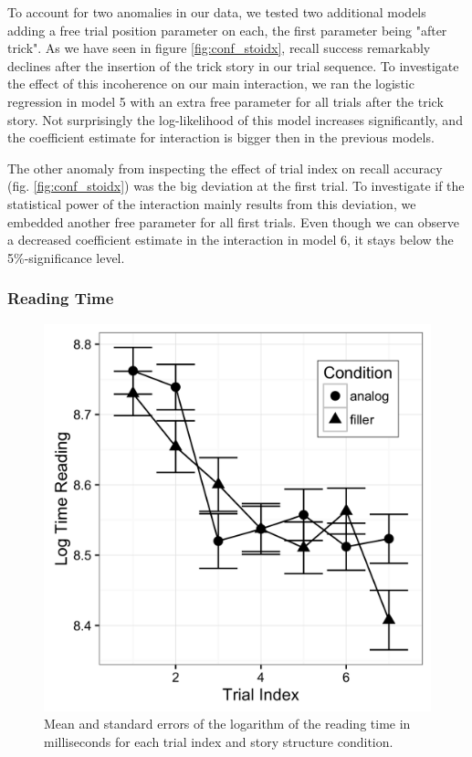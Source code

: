 \documentclass[a4paper,man,natbib,floatsintext,import]{apa6}
\begin{document}
\begin{landscape}

\end{landscape}

To account for two anomalies in our data, we tested two additional models adding a free trial position parameter on each, the first parameter being "after trick". As we have seen in figure \ref{fig:conf_stoidx}, recall success remarkably declines after the insertion of the trick story in our trial sequence. To investigate the effect of this incoherence on our main interaction, we ran the logistic regression in model 5 with an extra free parameter for all trials after the trick story. Not surprisingly the log-likelihood of this model increases significantly, and the coefficient estimate for interaction is bigger then in the previous models.

The other anomaly from inspecting the effect of trial index on recall accuracy (fig. \ref{fig:conf_stoidx}) was the big deviation at the first trial. To investigate if the statistical power of the interaction mainly results from this deviation, we embedded another free parameter for all first trials. Even though we can observe a decreased coefficient estimate in the interaction in model 6, it stays below the 5\%-significance level.

\subsubsection{Reading Time}

\begin{figure}
\centering
\begin{minipage}[t]{.5\textwidth}
\includegraphics[width=.9\linewidth]{figures/read.png}
\caption{Mean and standard errors of the logarithm of the reading time in milliseconds for each trial index and story structure condition.}
\label{fig:read}
\end{minipage}
\end{figure}
\end{document}
